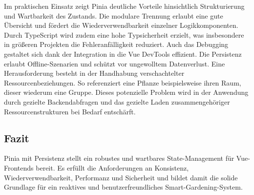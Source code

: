 Im praktischen Einsatz zeigt Pinia deutliche Vorteile hinsichtlich Strukturierung und Wartbarkeit des Zustands. Die modulare Trennung erlaubt eine gute Übersicht und fördert die Wiederverwendbarkeit einzelner Logikkomponenten. Durch TypeScript wird zudem eine hohe Typsicherheit erzielt, was insbesondere in größeren Projekten die Fehleranfälligkeit reduziert. Auch das Debugging gestaltet sich dank der Integration in die Vue DevTools effizient. Die Persistenz erlaubt Offline-Szenarien und schützt vor ungewolltem Datenverlust. Eine Herausforderung besteht in der Handhabung verschachtelter Ressourcenbeziehungen. So referenziert eine Pflanze beispielsweise ihren Raum, dieser wiederum eine Gruppe. Dieses potenzielle Problem wird in der Anwendung durch gezielte Backendabfragen und das gezielte Laden zusammengehöriger Ressourcenstrukturen bei Bedarf entschärft.

\subsection*{Fazit}

Pinia mit Persistenz stellt ein robustes und wartbares State-Management für Vue-Frontends bereit. Es erfüllt die Anforderungen an Konsistenz, Wiederverwendbarkeit, Performanz und Sicherheit und bildet damit die solide Grundlage für ein reaktives und benutzerfreundliches Smart-Gardening-System.


